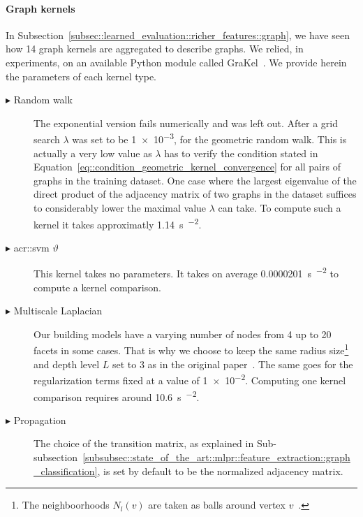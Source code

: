             \paragraph{Graph kernels}
                In Subsection~\ref{subsec::learned_evaluation::richer_features::graph}, we have seen how 14 graph kernels are aggregated to describe graphs.
                We relied, in experiments, on an available Python module called GraKel~\parencite{siglidis2018grakel}.
                We provide herein the parameters of each kernel type.
                \begin{description}
                    \item[\(\blacktriangleright\) Random walk] The exponential version fails numerically and was left out.
                                After a grid search \(\lambda\) was set to be \num{1e-3}, for the geometric random walk.
                                This is actually a very low value as \(\lambda\) has to verify the condition stated in Equation~\ref{eq::condition_geometric_kernel_convergence} for all pairs of graphs in the training dataset.
                                One case where the largest eigenvalue of the direct product of the adjacency matrix of two graphs in the dataset suffices to considerably lower the maximal value \(\lambda\) can take.
                                To compute such a kernel it takes approximatly \SI{1.14}{\s\per\building\squared}.
                    \item[\(\blacktriangleright\) \gls{acr::svm} \(\vartheta\)] This kernel takes no parameters.
                                It takes on average \SI{0.0000201}{\s\per\building\squared} to compute a kernel comparison.
                    \item[\(\blacktriangleright\) Multiscale Laplacian] Our building models have a varying number of nodes from 4 up to 20 facets in some cases.
                                That is why we choose to keep the same radius size\footnote{The neighboorhoods \(N_l(v)\) are taken as balls around vertex \(v\)~\parencite{kondor2016multiscale}.} and depth level \(L\) set to 3 as in the original paper~\parencite{kondor2016multiscale}.
                                The same goes for the regularization terms fixed at a value of \num{1e-2}.
                                Computing one kernel comparison requires around \SI{10.6}{\s\per\building\squared}.
                    \item[\(\blacktriangleright\) Propagation] The choice of the transition matrix, as explained in Sub-subsection~\ref{subsubsec::state_of_the_art::mlpr::feature_extraction::graph_classification}, is set by default to be the normalized adjacency matrix.

\end{description}

